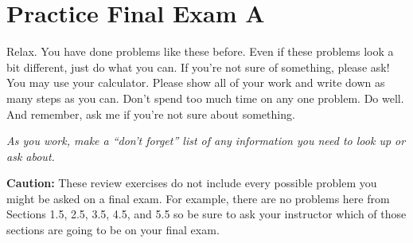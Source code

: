
\section*{Practice Final Exam A}  

Relax.  You have done problems like these before.  Even if these problems look a bit different, just do what you can.  If you're not sure of something, please ask! You may use your calculator.  Please show all of your work and write down as many steps as you can.  Don't spend too much time on any one problem.  Do well.  And remember, ask me if you're not sure about something. \bigskip

\noindent \emph{As you work, make a ``don't forget'' list of any information you need to look up or ask about.} \bigskip

\noindent \textbf{Caution:}  These review exercises do not include every possible problem you might be asked on a final exam.  For example, there are no problems here from Sections 1.5, 2.5, 3.5, 4.5, and 5.5 so be sure to ask your instructor which of those sections are going to be on your final exam.

\noindent \hrulefill
\bigskip

